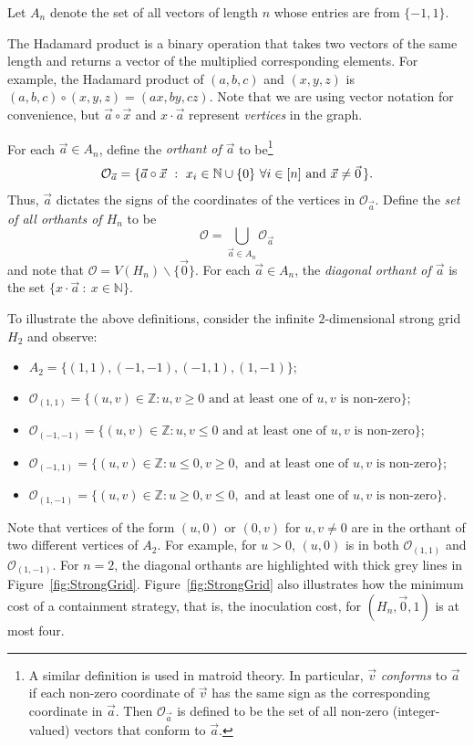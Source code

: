 \documentclass[unknownkeysallowed]{article}
\theoremstyle{definition}\newtheorem{strategy}{Strategy}
\theoremstyle{definition}\newtheorem{notation}{Notation}[theorem]
\begin{document}
Let $A_n$ denote the set of all vectors of length $n$ whose entries are from $\{-1,1\}$. 

The Hadamard product is a binary operation that takes two vectors of the same length and returns a vector of the multiplied corresponding elements.  For example, the Hadamard product of $(a,b,c)$ and $(x,y,z)$ is $(a,b,c) \circ (x,y,z) = (ax, by, cz)$.  Note that we are using vector notation for convenience, but $\vec{a} \circ \vec{x}$ and $x \cdot \vec{a}$ represent {\it vertices} in the graph. 


For each $\vec{a} \in A_n$, define the {\it orthant of $\vec{a}$} to be\footnote{A similar definition is used in matroid theory.  In particular, $\vec{v}$ \emph{conforms} to $\vec{a}$ if each non-zero coordinate of $\vec{v}$ has the same sign as the corresponding coordinate in $\vec{a}$.  Then $\mathcal{O}_{\vec{a}}$ is defined to be the set of all non-zero (integer-valued) vectors that conform to $\vec{a}$.} $$\mathcal{O}_{\vec{a}} = \{ \vec{a} \circ \vec{x} ~:~ x_i \in \mathbb{N} \cup \{0\}~\forall i \in [n] \text{~and~} \vec{x} \neq \vec{0}\hspace{0.5mm}\}.$$  Thus, $\vec{a}$ dictates the signs of the coordinates of the vertices in $\mathcal{O}_{\vec{a}}$. Define the {\it set of all orthants of $H_n$} to be $$\mathcal{O} = \bigcup_{\vec{a} \in A_n} \mathcal{O}_{\vec{a}}$$ and note that $\mathcal{O} = V(H_n) \backslash \{\vec{0}\}$. For each $\vec{a} \in A_n$, the {\it diagonal orthant of $\vec{a}$} is the set $\{ x \cdot\vec{a} ~:~ x \in \mathbb{N}\}$.

\bigskip

To illustrate the above definitions, consider the infinite $2$-dimensional strong grid $H_2$ and observe:
\begin{itemize}
\item $A_2 = \{(1,1),(-1,-1),(-1,1),(1,-1)\}$;
\item  $\mathcal{O}_{(1,1)} = \{(u,v) \in \mathbb{Z} : u,v \geq 0 \text{~and at least one of $u,v$ is non-zero} \}$;  
\item  $\mathcal{O}_{(-1,-1)} = \{(u,v) \in \mathbb{Z} : u,v \leq 0 \text{~and at least one of $u,v$ is non-zero} \}$;  
\item  $\mathcal{O}_{(-1,1)} = \{(u,v) \in \mathbb{Z} : u \leq 0, v \geq 0, \text{~and at least one of $u,v$ is non-zero} \}$;  
\item  $\mathcal{O}_{(1,-1)} = \{(u,v) \in \mathbb{Z} : u \geq 0, v \leq 0, \text{~and at least one of $u,v$ is non-zero} \}$.  
\end{itemize}  Note that vertices of the form $(u,0)$ or $(0,v)$ for $u, v \neq 0$ 
are in the orthant of two different vertices of $A_2$.  For example, for $u>0$, $(u,0)$  
is in both $\mathcal{O}_{(1,1)}$ and $\mathcal{O}_{(1,-1)}$. 
 For $n=2$, the diagonal orthants are highlighted with thick grey lines in Figure~\ref{fig:StrongGrid}.  Figure~\ref{fig:StrongGrid} also illustrates how the minimum cost of a containment strategy, that is, the inoculation cost, for $(H_n,\vec{0},1)$ is at most four. 
\end{document}
